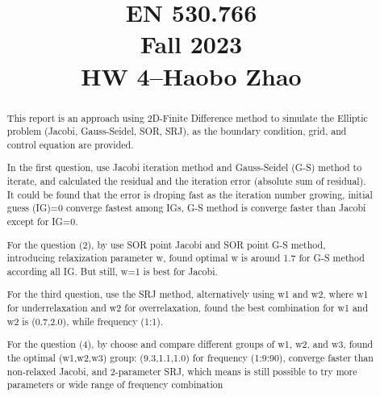 \documentclass[12pt]{article}
\begin{document}
\title{EN 530.766\\Fall 2023\\HW 4–Haobo Zhao}
\maketitle

\begin{abstract}
    This report is an approach using 2D-Finite Difference method to
    simulate the Elliptic problem (Jacobi, Gauss-Seidel, SOR, SRJ),
    as the boundary condition, grid, 
    and control equation are provided.

    In the first question, use Jacobi iteration method and Gauss-Seidel
    (G-S) method to iterate, and calculated the residual and the
    iteration error (absolute sum of residual). It could be found that 
    the error is droping fast as the iteration number 
    growing, initial guess (IG)=0 converge fastest among IGs, G-S method is  
    converge faster than Jacobi except for IG=0.
    
    For the question (2), by use SOR point Jacobi and 
    SOR point G-S method, introducing relaxization parameter w, 
    found optimal w is around 1.7 for G-S method according all IG. But 
    still, w=1 is best for Jacobi.

    For the third question, use the SRJ method, alternatively using w1 and w2,
    where w1 for underrelaxation and w2 for overrelaxation, found the best
    combination for w1 and w2 is (0.7,2.0), while frequency (1:1).

    For the question (4), by choose and compare different groups of
    w1, w2, and w3, found the optimal (w1,w2,w3) group: (9.3,1.1,1.0) for 
    frequency (1:9:90), converge faster than non-relaxed Jacobi, and 
    2-parameter SRJ, which means is still possible to try more parameters or
    wide range of frequency combination



\end{abstract}



\tableofcontents











\end{document}
